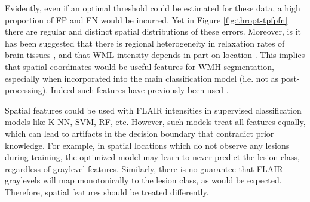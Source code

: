 \par
Evidently, even if an optimal threshold could be estimated for these data, a high proportion of FP and FN would be incurred. Yet in Figure \ref{fig:thropt-tpfpfn} there are regular and distinct spatial distributions of these errors. Moreover, is it has been suggested that there is regional heterogeneity in relaxation rates of brain tissues \cite{Sled2004}, and that WML intensity depends in part on location \cite{Stevenson2000,Harmouche2015}. This implies that spatial coordinates would be useful features for WMH segmentation, especially when incorporated into the main classification model (i.e. not as post-processing). Indeed such features have previously been used \cite{Anbeek2004,Anbeek2005,Dyrby2008,Griffanti2016,Dadar2017}.
\par
Spatial features could be used with FLAIR intensities in supervised classification models like K-NN, SVM, RF, etc. However, such models treat all features equally, which can lead to artifacts in the decision boundary that contradict prior knowledge. For example, in spatial locations which do not observe any lesions during training, the optimized model may learn to never predict the lesion class, regardless of graylevel features. Similarly, there is no guarantee that FLAIR graylevels will map monotonically to the lesion class, as would be expected. Therefore, spatial features should be treated differently.
